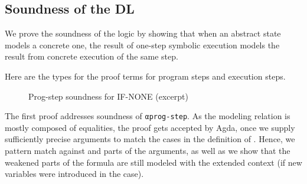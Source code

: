 
\subsection{Soundness of the DL}\label{soundness}

We prove the soundness of the logic by showing that
when an abstract state models a concrete one,
the result of one-step symbolic execution models the result from
concrete execution of the same step.

Here are the types for the proof terms for program steps and execution
steps.
\SoundnessProgStep
\SoundnessExecStep






\begin{figure}[tp]
\SoundnessCaseIfNone
  \caption{Prog-step soundness for IF-NONE (excerpt)}
  \label{fig:prog-step-soundness-if-none}
\end{figure}

The first proof addresses soundness of \verb/αprog-step/.
As the modeling relation is mostly composed of equalities, the proof
gets accepted by Agda, once we supply sufficiently precise arguments to match the cases in the definition
of . Hence, we pattern match against  and parts of the arguments,
as well as we show that the weakened parts of the formula
are still modeled with the extended context (if new variables were
introduced in the case).

